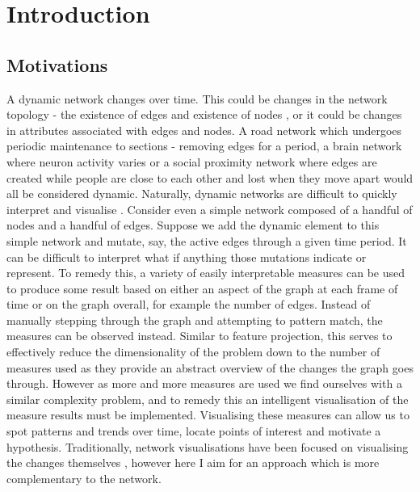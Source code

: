 
\chapter{Introduction}
\label{chap:introduction}
\ifpdf
    \graphicspath{{Introduction/Figures/PNG/}{Introduction/Figures/PDF/}{Introduction/Figures/}}
\else
    \graphicspath{{Introduction/Figures/EPS/}{Introduction/Figures/}}
\fi




\section{Motivations}
\label{motivations}
A dynamic network changes over time. This could be changes in the network topology - the existence of edges and existence of nodes \cite{itdn}, or it could be changes in attributes associated with edges and nodes.
A road network which undergoes periodic maintenance to sections - removing edges for a period, a brain network where neuron activity varies or a social proximity network where edges are created while people are close to each other and lost when they move apart would all be considered dynamic.
Naturally, dynamic networks are difficult to quickly interpret and visualise \cite{iddps}. Consider even a simple network composed of a handful of nodes and a handful of edges. Suppose we add the dynamic element to this simple network and mutate, say, the active edges through a given time period. It can be difficult to interpret what if anything those mutations indicate or represent.  To remedy this, a variety of easily interpretable measures can be used to produce some result based on either an aspect of the graph at each frame of time or on the graph overall, for example the number of edges. Instead of manually stepping through the graph and attempting to pattern match, the measures can be observed instead. Similar to feature projection, this serves to effectively reduce the dimensionality \cite{wikidimred} of the problem down to the number of measures used as they provide an abstract overview of the changes the graph goes through. However as more and more measures are used we find ourselves with a similar complexity problem, and to remedy this an intelligent visualisation of the measure results must be implemented. Visualising these measures can allow us to spot patterns and trends over time, locate points of interest and motivate a hypothesis. Traditionally, network visualisations have been focused on visualising the changes themselves \cite{tsotaivg}, however here I aim for an approach which is more complementary to the network.

